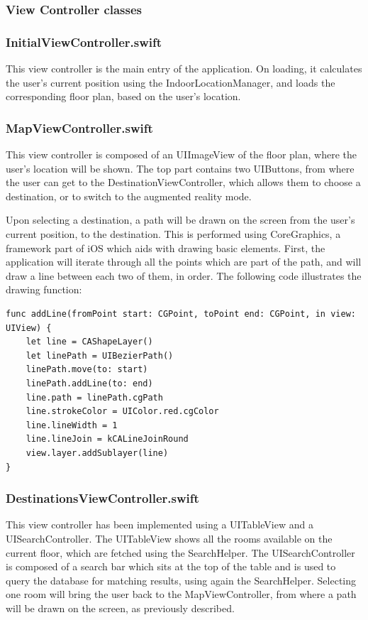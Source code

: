 \subsubsection{View Controller classes}
\subsubsection*{InitialViewController.swift}
This view controller is the main entry of the application. On loading, it calculates the user's current position using the IndoorLocationManager, and loads the corresponding floor plan, based on the user's location.

\subsubsection*{MapViewController.swift}
This view controller is composed of an UIImageView of the floor plan, where the user's location will be shown. The top part contains two UIButtons, from where the user can get to the DestinationViewController, which allows them to choose a destination, or to switch to the augmented reality mode.

Upon selecting a destination, a path will be drawn on the screen from the user's current position, to the destination. This is performed using CoreGraphics, a framework part of iOS which aids with drawing basic elements. First, the application will iterate through all the points which are part of the path, and will draw a line between each two of them, in order. The following code illustrates the drawing function:

\begin{lstlisting}
func addLine(fromPoint start: CGPoint, toPoint end: CGPoint, in view: UIView) {
	let line = CAShapeLayer()
    let linePath = UIBezierPath()
    linePath.move(to: start)
    linePath.addLine(to: end)
    line.path = linePath.cgPath
    line.strokeColor = UIColor.red.cgColor
    line.lineWidth = 1
    line.lineJoin = kCALineJoinRound
    view.layer.addSublayer(line)
}
\end{lstlisting}

\subsubsection*{DestinationsViewController.swift}
This view controller has been implemented using a UITableView and a UISearchController. The UITableView shows all the rooms available on the current floor, which are fetched using the SearchHelper. The UISearchController is composed of a search bar which sits at the top of the table and is used to query the database for matching results, using again the SearchHelper. Selecting one room will bring the user back to the MapViewController, from where a path will be drawn on the screen, as previously described.